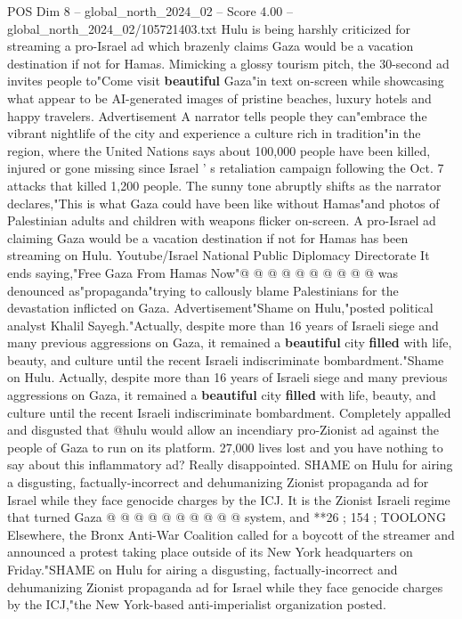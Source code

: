 \begin{textsample}{POS Dim 8 – global\_north\_2024\_02 – Score 4.00 – global\_north\_2024\_02/105721403.txt}  \label{ex:f8_pos_215}
Hulu is being harshly criticized for streaming a pro-Israel ad which brazenly claims Gaza would be a vacation destination if not for Hamas.
Mimicking a glossy tourism pitch, the 30-second ad invites people to"Come visit \textbf{beautiful} Gaza"in text on-screen while showcasing what appear to be AI-generated images of pristine beaches, luxury hotels and happy travelers.
Advertisement A narrator tells people they can"embrace the vibrant nightlife of the city and experience a culture rich in tradition"in the region, where the United Nations says about 100,000 people have been killed, injured or gone missing since Israel ' s retaliation campaign following the Oct. 7 attacks that killed 1,200 people.
The sunny tone abruptly shifts as the narrator declares,"This is what Gaza could have been like without Hamas"and photos of Palestinian adults and children with weapons flicker on-screen.
A pro-Israel ad claiming Gaza would be a vacation destination if not for Hamas has been streaming on Hulu.
Youtube/Israel National Public Diplomacy Directorate It ends saying,"Free Gaza From Hamas Now"@ @ @ @ @ @ @ @ @ @ was denounced as"propaganda"trying to callously blame Palestinians for the devastation inflicted on Gaza.
Advertisement"Shame on Hulu,"posted political analyst Khalil Sayegh."Actually, despite more than 16 years of Israeli siege and many previous aggressions on Gaza, it remained a \textbf{beautiful} city \textbf{filled} with life, beauty, and culture until the recent Israeli indiscriminate bombardment."Shame on Hulu.
Actually, despite more than 16 years of Israeli siege and many previous aggressions on Gaza, it remained a \textbf{beautiful} city \textbf{filled} with life, beauty, and culture until the recent Israeli indiscriminate bombardment.
Completely appalled and disgusted that @hulu would allow an incendiary pro-Zionist ad against the people of Gaza to run on its platform. 27,000 lives lost and you have nothing to say about this inflammatory ad?
Really disappointed.
SHAME on Hulu for airing a disgusting, factually-incorrect and dehumanizing Zionist propaganda ad for Israel while they face genocide charges by the ICJ.
It is the Zionist Israeli regime that turned Gaza @ @ @ @ @ @ @ @ @ @ system, and **26 ; 154 ; TOOLONG Elsewhere, the Bronx Anti-War Coalition called for a boycott of the streamer and announced a protest taking place outside of its New York headquarters on Friday."SHAME on Hulu for airing a disgusting, factually-incorrect and dehumanizing Zionist propaganda ad for Israel while they face genocide charges by the ICJ,"the New York-based anti-imperialist organization posted.

\end{textsample}
